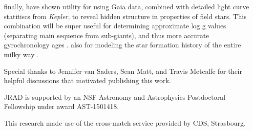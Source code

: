 \documentclass[manuscript, letterpaper]{aastex6}
\newcommand{\Kepler}{\textsl{Kepler}\xspace}
\begin{document}
finally, %
have shown utility for using Gaia data, combined with detailed light curve statitiscs from \Kepler, to reveal hidden structure in properties of field stars. This combination will be super useful for determining approximate log g values (separating main sequence from sub-giants), and thus more accurate gyrochronology ages \citep{van-saders2013}. also for modeling the star formation history of the entire milky way \citep[e.g.][]{bertelli1999}.



\acknowledgments
Special thanks to Jennifer van Saders, Sean Matt, and Travis Metcalfe for their helpful discussions that motivated publishing this work.

JRAD is supported by an NSF Astronomy and Astrophysics Postdoctoral Fellowship under award AST-1501418.

This research made use of the cross-match service provided by CDS, Strasbourg.


\end{document}
